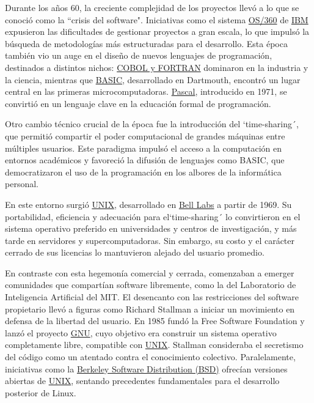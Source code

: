 \documentclass[a4paper,12pt]{article}
\begin{document}
Durante los años 60, la creciente complejidad de los proyectos llevó a lo que se
conoció como la ``crisis del software". Iniciativas como el sistema \hyperref[os360]{OS/360} de \hyperref[ibm]{IBM}
expusieron las dificultades de gestionar proyectos a gran escala, lo que impulsó
la búsqueda de metodologías más estructuradas para el desarrollo. Esta época
también vio un auge en el diseño de nuevos lenguajes de programación, destinados
a distintos nichos: \hyperref[cobolfortran]{COBOL y FORTRAN} dominaron en la industria y la ciencia,
mientras que \hyperref[basic]{BASIC}, desarrollado en Dartmouth, encontró un lugar central en las
primeras microcomputadoras. \hyperref[pascal]{Pascal}, introducido en 1971, se convirtió en un
lenguaje clave en la educación formal de programación.

Otro cambio técnico crucial de la época fue la introducción del `time-sharing´,
que permitió compartir el poder computacional de grandes máquinas entre
múltiples usuarios. Este paradigma impulsó el acceso a la computación en
entornos académicos y favoreció la difusión de lenguajes como BASIC, que
democratizaron el uso de la programación en los albores de la informática
personal.

En este entorno surgió \hyperref[unix]{UNIX}, desarrollado en \hyperref[belllabs]{Bell Labs} a partir de 1969. Su
portabilidad, eficiencia y adecuación para el`time-sharing´ lo convirtieron en el
sistema operativo preferido en universidades y centros de investigación, y más
tarde en servidores y supercomputadoras. Sin embargo, su costo y el carácter
cerrado de sus licencias lo mantuvieron alejado del usuario promedio.

En contraste con esta hegemonía comercial y cerrada, comenzaban a emerger
comunidades que compartían software libremente, como la del Laboratorio de
Inteligencia Artificial del MIT. El desencanto con las restricciones del
software propietario llevó a figuras como Richard Stallman a iniciar un
movimiento en defensa de la libertad del usuario. En 1985 fundó la Free Software
Foundation y lanzó el proyecto \hyperref[gnu]{GNU}, cuyo objetivo era construir un sistema
operativo completamente libre, compatible con \hyperref[unix]{UNIX}. Stallman consideraba el
secretismo del código como un atentado contra el conocimiento colectivo.
Paralelamente, iniciativas como la \hyperref[bsd]{Berkeley Software Distribution (BSD)} ofrecían
versiones abiertas de \hyperref[unix]{UNIX}, sentando precedentes fundamentales para el
desarrollo posterior de Linux.
\end{document}
